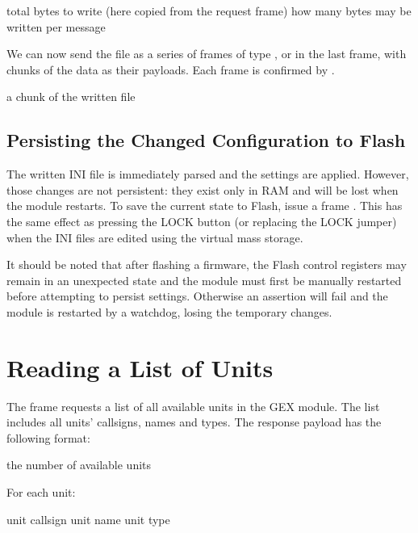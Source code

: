 \begin{boxedpayload}
	 total bytes to write (here copied from the request frame)
	 how many bytes may be written per message
\end{boxedpayload}

We can now send the file as a series of frames of type \CmdBulkData, or \CmdBulkEnd in the last frame, with chunks of the data as their payloads. Each frame is confirmed by \CmdSuccess.

\begin{boxedpayload}
	 a chunk of the written file
\end{boxedpayload}

\subsection{Persisting the Changed Configuration to Flash}

The written INI file is immediately parsed and the settings are applied. However, those changes are not persistent: they exist only in RAM and will be lost when the module restarts. To save the current state to Flash, issue a frame \CmdPersistConfig. This has the same effect as pressing the LOCK button (or replacing the LOCK jumper) when the INI files are edited using the virtual mass storage.

It should be noted that after flashing a firmware, the Flash control registers may remain in an unexpected state and the module must first be manually restarted before attempting to persist settings. Otherwise an assertion will fail and the module is restarted by a watchdog, losing the temporary changes.



\section{Reading a List of Units}

The frame \CmdListUnits requests a list of all available units in the GEX module. The list includes all units' callsigns, names and types. The response payload has the following format:

\begin{boxedpayload}
	 the number of available units
	\item For each unit:
		\begin{pldlist}
			 unit callsign
			 unit name
			 unit type
		\end{pldlist}
\end{boxedpayload}


